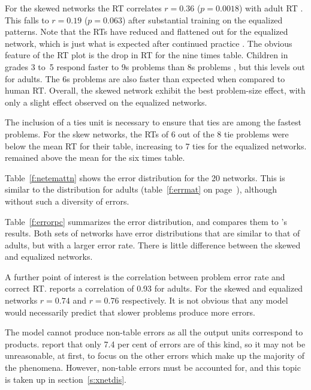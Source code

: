 For the skewed networks the RT correlates $r=0.36$ ($p=0.0018$) with adult
RT \cite{camp85}. This falls to $r=0.19$ ($p=0.063$) after substantial
training on the equalized patterns.  Note that the RTs have reduced and
flattened out for the equalized network, which is just what is expected
after continued practice \cite[p.~349]{camp85}. The obvious feature of the
RT plot is the drop in RT for the nine times table.  Children in grades 3
to~5 respond faster to 9s problems than 8s problems \cite{camp85}, but this
levels out for adults.  The 6s problems are also faster than expected
when compared to human RT\@.
Overall, the skewed network exhibit the best problem-size effect, with
only a slight effect observed on the equalized networks.

The inclusion of a ties unit is necessary to ensure that ties are among the
fastest problems. For the skew networks, the RTs of 6 out of the 8 tie
problems were below the mean RT for their table, increasing to 7 ties for
the equalized networks.  remained above the mean for the six times
table.



Table~\ref{f:netemattn} shows the error distribution for the 20 networks.
This is similar to the distribution for adults (table~\ref{f:errmat} on
page~\pageref{f:errmat}), although without such a diversity of errors.

Table~\ref{f:errorpc} summarizes the error distribution, and compares them
to \citeauthor{camp85}'s results.  Both sets of networks have error
distributions that are similar to that of adults, but with a larger error
rate. There is little difference between the skewed and equalized networks.

A further point of interest is the correlation between problem error rate
and correct RT.  reports a correlation of 0.93 for
adults.  For the skewed and equalized networks $r=0.74$
and $r=0.76$ respectively.  It is not obvious that any model
would necessarily predict that slower problems produce more errors.

The model cannot produce non-table errors as all the output units
correspond to products.  report that only 7.4 per cent of
errors are of this kind, so it may not be unreasonable, at first, to focus
on the other errors which make up the majority of the phenomena.
However, non-table errors must be
accounted for, and this topic is taken up in section~\ref{s:xnetdis}.


\def\noteast{\hspace{-1.5em}\mbox{\raise 1mm\hbox{\footnotesize$\ast$}}}
\def\notedag{\mbox{\raise 1mm\hbox{\footnotesize\dag}}}

